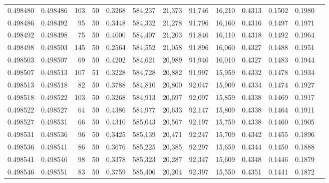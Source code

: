 \begin{tabular}{rrrrrrrrrrrrr}
0.498480 & 0.498486 &   103 &  50 &                                     0.3268 & 584,237 &  21,373 &  91,746 &  16,210 & 0.4313 & 0.1502 & 0.1980 \\
0.498486 & 0.498492 &    95 &  50 &                                     0.3448 & 584,332 &  21,278 &  91,796 &  16,160 & 0.4316 & 0.1497 & 0.1971 \\
0.498492 & 0.498498 &    75 &  50 &                                     0.4000 & 584,407 &  21,203 &  91,846 &  16,110 & 0.4318 & 0.1492 & 0.1964 \\
0.498498 & 0.498503 &   145 &  50 &                                     0.2564 & 584,552 &  21,058 &  91,896 &  16,060 & 0.4327 & 0.1488 & 0.1951 \\
0.498503 & 0.498507 &    69 &  50 &                                     0.4202 & 584,621 &  20,989 &  91,946 &  16,010 & 0.4327 & 0.1483 & 0.1944 \\
0.498507 & 0.498513 &   107 &  51 &                                     0.3228 & 584,728 &  20,882 &  91,997 &  15,959 & 0.4332 & 0.1478 & 0.1934 \\
0.498513 & 0.498518 &    82 &  50 &                                     0.3788 & 584,810 &  20,800 &  92,047 &  15,909 & 0.4334 & 0.1474 & 0.1927 \\
0.498518 & 0.498522 &   103 &  50 &                                     0.3268 & 584,913 &  20,697 &  92,097 &  15,859 & 0.4338 & 0.1469 & 0.1917 \\
0.498522 & 0.498527 &    64 &  50 &                                     0.4386 & 584,977 &  20,633 &  92,147 &  15,809 & 0.4338 & 0.1464 & 0.1911 \\
0.498527 & 0.498531 &    66 &  50 &                                     0.4310 & 585,043 &  20,567 &  92,197 &  15,759 & 0.4338 & 0.1460 & 0.1905 \\
0.498531 & 0.498536 &    96 &  50 &                                     0.3425 & 585,139 &  20,471 &  92,247 &  15,709 & 0.4342 & 0.1455 & 0.1896 \\
0.498536 & 0.498541 &    86 &  50 &                                     0.3676 & 585,225 &  20,385 &  92,297 &  15,659 & 0.4344 & 0.1450 & 0.1888 \\
0.498541 & 0.498546 &    98 &  50 &                                     0.3378 & 585,323 &  20,287 &  92,347 &  15,609 & 0.4348 & 0.1446 & 0.1879 \\
0.498546 & 0.498551 &    83 &  50 &                                     0.3759 & 585,406 &  20,204 &  92,397 &  15,559 & 0.4351 & 0.1441 & 0.1872 \\

\end{tabular}
